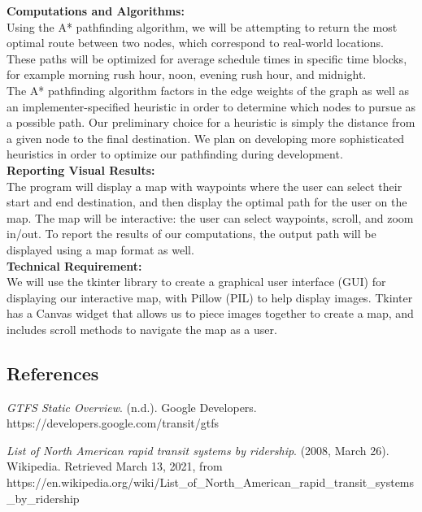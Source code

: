 \documentclass[fontsize=11pt]{article}
\begin{document}
    \noindent \textbf{Computations and Algorithms:} \\
    \indent Using the A* pathfinding algorithm, we will be attempting to return the most optimal route between two nodes, which correspond to real-world locations. These paths will be optimized for average schedule times in specific time blocks, for example morning rush hour, noon, evening rush hour, and midnight. \\

    The A* pathfinding algorithm factors in the edge weights of the graph as well as an implementer-specified heuristic in order to determine which nodes to pursue as a possible path. Our preliminary choice for a heuristic is simply the distance from a given node to the final destination. We plan on developing more sophisticated heuristics in order to optimize our pathfinding during development. \\

    \noindent \textbf{Reporting Visual Results:} \\
    \indent The program will display a map with waypoints where the user can select their start and end destination, and then display the optimal path for the user on the map. The map will be interactive: the user can select waypoints, scroll, and zoom in/out. To report the results of our computations, the output path will be displayed using a map format as well. \\

    \noindent \textbf{Technical Requirement:} \\
    \indent We will use the tkinter library to create a graphical user interface (GUI) for displaying our interactive map, with Pillow (PIL) to help display images. Tkinter has a Canvas widget that allows us to piece images together to create a map, and includes scroll methods to navigate the map as a user.

    \newpage

    \begin{center}
        \section*{References}
    \end{center}

    \hangindent=0.75in
    \textit{GTFS Static Overview}. (n.d.). Google Developers. https://developers.google.com/transit/gtfs

    \hangindent=0.75in
    \textit{List of North American rapid transit systems by ridership}. (2008, March 26). Wikipedia. Retrieved March 13, 2021, from https://en.wikipedia.org/wiki/List\_of\_North\_American\_rapid\_transit\_systems\_by\_ridership
\end{document}
